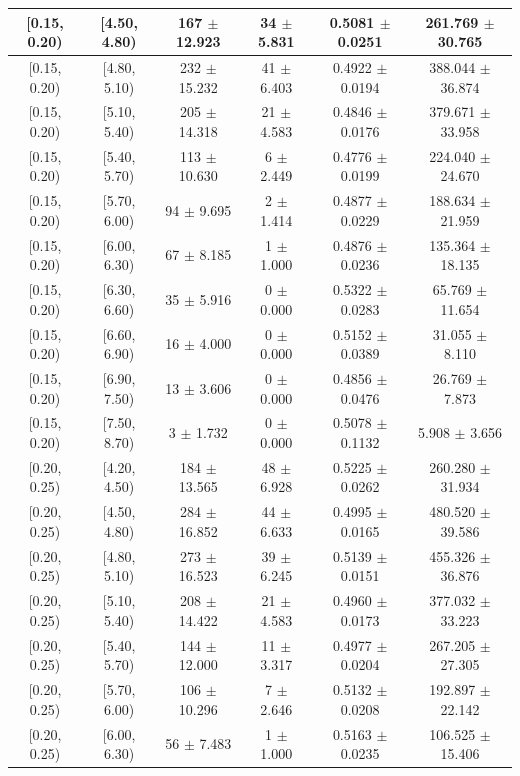 \begin{longtable}{|c|c|c|c|c|c|}
\hline
[0.15, 0.20) & [4.50, 4.80) & 167 $\pm$ 12.923 & 34 $\pm$ 5.831 & 0.5081 $\pm$ 0.0251 & 261.769 $\pm$ 30.765 \\ 
\hline
[0.15, 0.20) & [4.80, 5.10) & 232 $\pm$ 15.232 & 41 $\pm$ 6.403 & 0.4922 $\pm$ 0.0194 & 388.044 $\pm$ 36.874 \\ 
\hline
[0.15, 0.20) & [5.10, 5.40) & 205 $\pm$ 14.318 & 21 $\pm$ 4.583 & 0.4846 $\pm$ 0.0176 & 379.671 $\pm$ 33.958 \\ 
\hline
[0.15, 0.20) & [5.40, 5.70) & 113 $\pm$ 10.630 & 6 $\pm$ 2.449 & 0.4776 $\pm$ 0.0199 & 224.040 $\pm$ 24.670 \\ 
\hline
[0.15, 0.20) & [5.70, 6.00) & 94 $\pm$ 9.695 & 2 $\pm$ 1.414 & 0.4877 $\pm$ 0.0229 & 188.634 $\pm$ 21.959 \\ 
\hline
[0.15, 0.20) & [6.00, 6.30) & 67 $\pm$ 8.185 & 1 $\pm$ 1.000 & 0.4876 $\pm$ 0.0236 & 135.364 $\pm$ 18.135 \\ 
\hline
[0.15, 0.20) & [6.30, 6.60) & 35 $\pm$ 5.916 & 0 $\pm$ 0.000 & 0.5322 $\pm$ 0.0283 & 65.769 $\pm$ 11.654 \\ 
\hline
[0.15, 0.20) & [6.60, 6.90) & 16 $\pm$ 4.000 & 0 $\pm$ 0.000 & 0.5152 $\pm$ 0.0389 & 31.055 $\pm$ 8.110 \\ 
\hline
[0.15, 0.20) & [6.90, 7.50) & 13 $\pm$ 3.606 & 0 $\pm$ 0.000 & 0.4856 $\pm$ 0.0476 & 26.769 $\pm$ 7.873 \\ 
\hline
[0.15, 0.20) & [7.50, 8.70) & 3 $\pm$ 1.732 & 0 $\pm$ 0.000 & 0.5078 $\pm$ 0.1132 & 5.908 $\pm$ 3.656 \\ 
\hline
[0.20, 0.25) & [4.20, 4.50) & 184 $\pm$ 13.565 & 48 $\pm$ 6.928 & 0.5225 $\pm$ 0.0262 & 260.280 $\pm$ 31.934 \\ 
\hline
[0.20, 0.25) & [4.50, 4.80) & 284 $\pm$ 16.852 & 44 $\pm$ 6.633 & 0.4995 $\pm$ 0.0165 & 480.520 $\pm$ 39.586 \\ 
\hline
[0.20, 0.25) & [4.80, 5.10) & 273 $\pm$ 16.523 & 39 $\pm$ 6.245 & 0.5139 $\pm$ 0.0151 & 455.326 $\pm$ 36.876 \\ 
\hline
[0.20, 0.25) & [5.10, 5.40) & 208 $\pm$ 14.422 & 21 $\pm$ 4.583 & 0.4960 $\pm$ 0.0173 & 377.032 $\pm$ 33.223 \\ 
\hline
[0.20, 0.25) & [5.40, 5.70) & 144 $\pm$ 12.000 & 11 $\pm$ 3.317 & 0.4977 $\pm$ 0.0204 & 267.205 $\pm$ 27.305 \\ 
\hline
[0.20, 0.25) & [5.70, 6.00) & 106 $\pm$ 10.296 & 7 $\pm$ 2.646 & 0.5132 $\pm$ 0.0208 & 192.897 $\pm$ 22.142 \\ 
\hline
[0.20, 0.25) & [6.00, 6.30) & 56 $\pm$ 7.483 & 1 $\pm$ 1.000 & 0.5163 $\pm$ 0.0235 & 106.525 $\pm$ 15.406 \\ 

\end{longtable}
